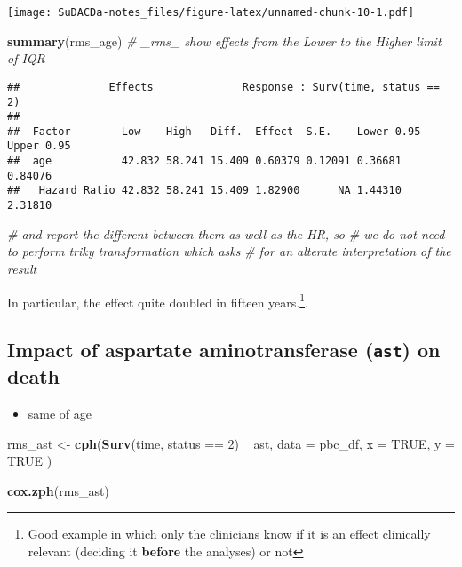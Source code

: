 \documentclass[]{book}
\newenvironment{Shaded}{\begin{snugshade}}{\end{snugshade}}
\newcommand{\KeywordTok}[1]{\textcolor[rgb]{0.13,0.29,0.53}{\textbf{{#1}}}}
\newcommand{\DataTypeTok}[1]{\textcolor[rgb]{0.13,0.29,0.53}{{#1}}}
\newcommand{\DecValTok}[1]{\textcolor[rgb]{0.00,0.00,0.81}{{#1}}}
\newcommand{\StringTok}[1]{\textcolor[rgb]{0.31,0.60,0.02}{{#1}}}
\newcommand{\CommentTok}[1]{\textcolor[rgb]{0.56,0.35,0.01}{\textit{{#1}}}}
\newcommand{\OtherTok}[1]{\textcolor[rgb]{0.56,0.35,0.01}{{#1}}}
\newcommand{\NormalTok}[1]{{#1}}
\providecommand{\tightlist}{%
  \setlength{\itemsep}{0pt}\setlength{\parskip}{0pt}}
\let\rmarkdownfootnote\footnote%
\def\footnote{\protect\rmarkdownfootnote}
\theoremstyle{definition}
\theoremstyle{definition}
\theoremstyle{definition}
\theoremstyle{remark}
\begin{document}
\texttt{[image: SuDACDa-notes\_files/figure-latex/unnamed-chunk-10-1.pdf]}

\begin{Shaded}
\begin{Highlighting}[]
\KeywordTok{summary}\NormalTok{(rms_age)  }\CommentTok{# _rms_ show effects from the Lower to the Higher limit of IQR}
\end{Highlighting}
\end{Shaded}

\begin{verbatim}
##              Effects              Response : Surv(time, status == 2) 
## 
##  Factor        Low    High   Diff.  Effect  S.E.    Lower 0.95 Upper 0.95
##  age           42.832 58.241 15.409 0.60379 0.12091 0.36681    0.84076   
##   Hazard Ratio 42.832 58.241 15.409 1.82900      NA 1.44310    2.31810
\end{verbatim}

\begin{Shaded}
\begin{Highlighting}[]
                  \CommentTok{# and report the different between them as well as the HR, so}
                  \CommentTok{# we do not need to perform triky transformation which asks}
                  \CommentTok{# for an alterate interpretation of the result}
\end{Highlighting}
\end{Shaded}

In particular, the effect quite doubled in fifteen years.\footnote{Good
  example in which only the clinicians know if it is an effect
  clinically relevant (deciding it \textbf{before} the analyses) or not}.

\subsection{\texorpdfstring{Impact of aspartate aminotransferase
(\texttt{ast}) on
death}{Impact of aspartate aminotransferase (ast) on death}}\label{ast2}

\begin{itemize}
\tightlist
\item
  same of age
\end{itemize}

\begin{Shaded}
\begin{Highlighting}[]
\NormalTok{rms_ast <-}\StringTok{ }\KeywordTok{cph}\NormalTok{(}\KeywordTok{Surv}\NormalTok{(time, status ==}\StringTok{ }\DecValTok{2}\NormalTok{) ~}\StringTok{ }\NormalTok{ast,}
  \DataTypeTok{data =} \NormalTok{pbc_df,}
  \DataTypeTok{x    =} \OtherTok{TRUE}\NormalTok{,}
  \DataTypeTok{y    =} \OtherTok{TRUE}
\NormalTok{)}

\KeywordTok{cox.zph}\NormalTok{(rms_ast)}
\end{Highlighting}
\end{Shaded}
\end{document}
